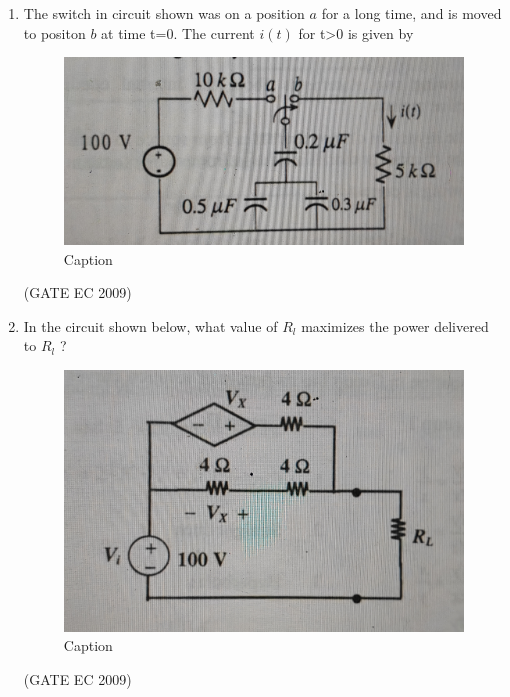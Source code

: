 \documentclass[journal,12pt,onecolumn]{IEEEtran}
\theoremstyle{remark}
\begin{document}
\begin{enumerate}[start=1, label={Q\arabic*.}]
\item The switch in circuit shown was on a position $a$ for a long time, and is moved to positon $b$ at time t=0. The current $i(t)$ for t>0 is given by 
\begin{figure}[H]
    \centering
    \includegraphics[width=0.5\linewidth]{images/img_10.jpg}
    \caption{Caption}
    \label{fig:placeholder}
\end{figure}

\begin{enumerate}[label=(\Alph*)]
\end{enumerate}
\hfill (GATE EC 2009)

\item In the circuit shown below, what value of $R_l$ maximizes the power delivered to $R_l$ ?
\begin{figure}[H]
    \centering
    \includegraphics[width=0.5\linewidth]{images/img_11.jpg}
    \caption{Caption}
    \label{fig:placeholder}
\end{figure}
\begin{enumerate}[label=(\Alph*)]
\end{enumerate}
\hfill (GATE EC 2009)


\end{enumerate}
\end{document}
